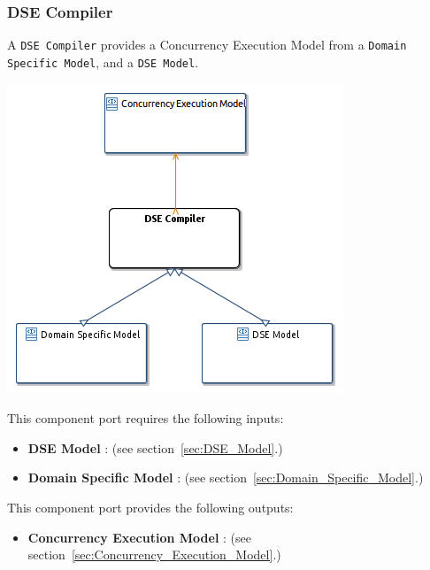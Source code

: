 \documentclass{gemoc} %
\begin{document}
\subsubsection{DSE Compiler}
\label{sec:DSE_Compiler}
A \texttt{DSE Compiler} provides a Concurrency Execution Model from a \texttt{Domain Specific Model}, and a \texttt{DSE Model}.
\begin{center}
\includegraphics*[trim=0.0cm 0.0cm 0cm 0.0cm, clip=true]{../images/generated/Generated_DSE_Compiler.png}
\end{center}

This component port requires the following inputs:
\begin{itemize}
  \item \textbf{DSE Model} :
(see section~\ref{sec:DSE_Model}.)
  \item \textbf{Domain Specific Model} :
(see section~\ref{sec:Domain_Specific_Model}.)
\end{itemize}

This component port provides the following outputs:
\begin{itemize}
  \item \textbf{Concurrency Execution Model} :
(see section~\ref{sec:Concurrency_Execution_Model}.)
\end{itemize}
\end{document}
